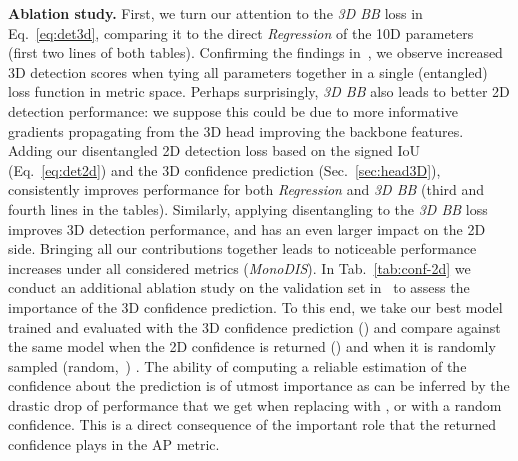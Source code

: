 \documentclass[10pt,twocolumn,letterpaper]{article}
\newcommand{\monodis}{MonoDIS}
\renewcommand{\paragraph}[1]{

        \vspace{3pt}
	\noindent\textbf{#1}}
\begin{document}
\paragraph{Ablation study.}
First, we turn our attention to the \textit{3D BB} loss in Eq.~\eqref{eq:det3d}, comparing it to the direct \textit{Regression} of the 10D parameters ~\cite{Manhardt_2019_CVPR} (first two lines of both tables).
Confirming the findings in~\cite{Manhardt_2019_CVPR}, we observe increased 3D detection scores when tying all parameters together in a single (entangled) loss function in metric space.
Perhaps surprisingly, \textit{3D BB} also leads to better 2D detection performance: we suppose this could be due to more informative gradients propagating from the 3D head improving the backbone features.
Adding our disentangled 2D detection loss based on the signed IoU (Eq.~\eqref{eq:det2d}) and the 3D confidence prediction (Sec.~\ref{sec:head3D}), consistently improves performance for both \textit{Regression} and \textit{3D BB} (third and fourth lines in the tables).
Similarly, applying disentangling to the \textit{3D BB} loss improves 3D detection performance, and has an even larger impact on the 2D side.
Bringing all our contributions together leads to noticeable performance increases under all considered metrics (\textit{\monodis}).
In Tab.~\ref{tab:conf-2d} we conduct an additional ablation study on the validation set in~\cite{NIPS2015_Chen} to assess the importance of the 3D confidence prediction. To this end, we take our best model trained and evaluated with the 3D confidence prediction () and compare against the same model when the 2D confidence is returned () and when it is randomly sampled (random,~) . The ability of computing a reliable estimation of the confidence about the prediction is of utmost importance as can be inferred by the drastic drop of performance that we get when replacing  with , or with a random confidence. This is a direct consequence of the important role that the returned confidence plays in the AP metric.
\end{document}
